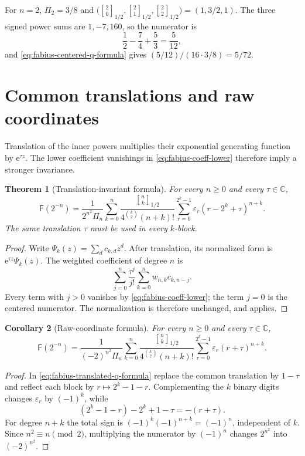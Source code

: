 \documentclass[11pt,oneside,openany]{book}
\newtheorem{theorem}{Theorem}[chapter]
\newtheorem{corollary}[theorem]{Corollary}
\theoremstyle{definition}
\theoremstyle{remark}
\newcommand{\Qbinom}[3]{\genfrac{[}{]}{0pt}{}{#1}{#2}_{#3}}
\newcommand{\eps}{\varepsilon}
\newcommand{\C}{\mathbb C}
\newcommand{\e}{\mathrm e}
\newcommand{\Fab}{\mathsf F}
\begin{document}
For $n=2$, $\Pi_2=3/8$ and
$\bigl(\Qbinom20{1/2},\Qbinom21{1/2},\Qbinom22{1/2}\bigr)
=(1,3/2,1)$.  The three signed power sums are $1,-7,160$, so the numerator is
\[
 \frac12-\frac74+\frac53=\frac5{12},
\]
and \eqref{eq:fabius-centered-q-formula} gives
$(5/12)/(16\cdot3/8)=5/72$.

\section{Common translations and raw coordinates}

Translation of the inner powers multiplies their exponential generating
function by $\e^{\tau z}$.  The lower coefficient vanishings in
\eqref{eq:fabius-coeff-lower} therefore imply a stronger invariance.

\begin{theorem}[Translation-invariant formula]\label{thm:fabius-translated-q-formula}
For every $n\ge0$ and every $\tau\in\C$,
\begin{equation}\label{eq:fabius-translated-q-formula}
\boxed{
 \Fab(2^{-n})=
 \frac1{2^{n^2}\Pi_n}
 \sum_{k=0}^n
 \frac{\Qbinom nk{1/2}}{4^{\binom k2}(n+k)!}
 \sum_{r=0}^{2^k-1}\eps_r(r-2^k+\tau)^{n+k}.}
\end{equation}
The same translation $\tau$ must be used in every $k$-block.
\end{theorem}

\begin{proof}
Write $\Psi_k(z)=\sum_dc_{k,d}z^d$.  After translation, its normalized form
is $\e^{\tau z}\Psi_k(z)$.  The weighted coefficient of degree $n$ is
\[
 \sum_{j=0}^n\frac{\tau^j}{j!}
 \sum_{k=0}^nw_{n,k}c_{k,n-j}.
\]
Every term with $j>0$ vanishes by
\eqref{eq:fabius-coeff-lower}; the term $j=0$ is the centered numerator.
The normalization is therefore unchanged, and
 applies.
\end{proof}

\begin{corollary}[Raw-coordinate formula]\label{cor:fabius-raw-q-formula}
For every $n\ge0$ and every $\tau\in\C$,
\begin{equation}\label{eq:fabius-raw-q-formula}
\boxed{
 \Fab(2^{-n})=
 \frac1{(-2)^{n^2}\Pi_n}
 \sum_{k=0}^n
 \frac{\Qbinom nk{1/2}}{4^{\binom k2}(n+k)!}
 \sum_{r=0}^{2^k-1}\eps_r(r+\tau)^{n+k}.}
\end{equation}
\end{corollary}

\begin{proof}
In \eqref{eq:fabius-translated-q-formula} replace the common translation by
$1-\tau$ and reflect each block by $r\mapsto2^k-1-r$.  Complementing the
$k$ binary digits changes $\eps_r$ by $(-1)^k$, while
\[
 (2^k-1-r)-2^k+1-\tau=-(r+\tau).
\]
For degree $n+k$ the total sign is
$(-1)^k(-1)^{n+k}=(-1)^n$, independent of $k$.  Since
$n^2\equiv n\pmod2$, multiplying the numerator by $(-1)^n$ changes
$2^{n^2}$ into $(-2)^{n^2}$.
\end{proof}
\end{document}
